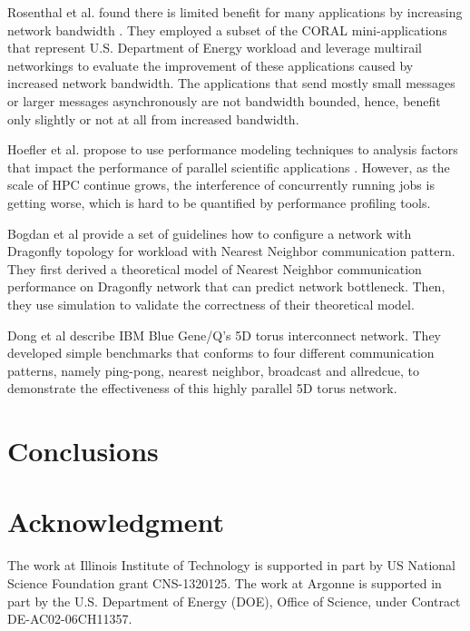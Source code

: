 \documentclass[conference]{IEEEtran}
\begin{document}
Rosenthal et al. found there is limited benefit for many applications by
increasing network bandwidth \cite{rosenthal}. They employed a subset of the
CORAL mini-applications that represent U.S. Department of Energy workload and
leverage multirail networkings to evaluate the improvement of these applications
caused by increased network bandwidth. The applications that send mostly small
messages or larger messages asynchronously are not bandwidth bounded, hence,
benefit only slightly or not at all from increased bandwidth.

   

Hoefler et al. propose to use performance modeling techniques to analysis 
factors that impact the performance of parallel scientific applications 
\cite{hoefler-modeling}. However, as the scale of HPC continue grows, the 
interference of concurrently running jobs is getting worse, which is hard to be 
quantified by performance profiling tools.


Bogdan et al provide a set of guidelines how to configure a network with 
Dragonfly topology for workload with Nearest Neighbor communication 
pattern\cite{Bogdan-hpdc14}. They first derived a theoretical model of Nearest 
Neighbor communication performance on Dragonfly network that can predict network 
bottleneck. Then, they use simulation to validate the correctness of their 
theoretical model.

Dong et al describe IBM Blue Gene/Q's 5D torus interconnect
network\cite{Dong-SC11}. They developed simple benchmarks that conforms to four
different communication patterns, namely ping-pong, nearest neighbor, broadcast
and allredcue, to demonstrate the effectiveness of this highly parallel 5D torus
network.



\section{Conclusions}
\label{sec:conclusion}


\section*{Acknowledgment}
\label{sec: ack}
The work at Illinois Institute of Technology is supported in part by
US National Science Foundation grant CNS-1320125. The work at Argonne is
supported in part by the U.S. Department of Energy (DOE), Office of Science,
under Contract DE-AC02-06CH11357.
\end{document}
